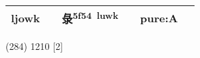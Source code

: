 \documentclass[14pt,a4paper]{scrartcl}
\begin{document}
\begin{longtable}[c]{@{}llllll@{}}
\begin{minipage}[t]{0.14\columnwidth}\raggedright\strut
ljowk
\strut\end{minipage} &
\begin{minipage}[t]{0.14\columnwidth}\raggedright\strut
\strut\end{minipage} &
\begin{minipage}[t]{0.14\columnwidth}\raggedright\strut
彔\textsuperscript{5f54~luwk}
\strut\end{minipage} &
\begin{minipage}[t]{0.14\columnwidth}\raggedright\strut
\strut\end{minipage} &
\begin{minipage}[t]{0.14\columnwidth}\raggedright\strut
pure:A
\strut\end{minipage}\tabularnewline
\bottomrule
\end{longtable}

(284) 1210 {[}2{]}
\end{document}
